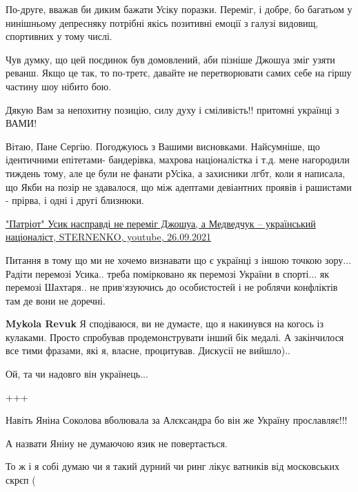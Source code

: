 \begin{itemize}
По-друге, вважав би диким бажати Усіку поразки. Переміг, і добре, бо багатьом у
нинішньому депресняку потрібні якісь позитивні емоції з галузі видовищ,
спортивних у тому числі.

Чув думку, що цей поєдинок був домовлений, аби пізніше Джошуа зміг узяти
реванш. Якщо це так, то по-третє, давайте не перетворювати самих себе на гіршу
частину шоу нібито бою.


Дякую Вам за непохитну позицію, силу духу і сміливість!! притомні українці з ВАМИ!


Вітаю, Пане Сергію. Погоджуюсь з Вашими висновками. Найсумніше, що ідентичними
епітетами- бандерівка, махрова націоналістка і т.д. мене нагородили тиждень
тому, але це були не фанати рУсіка, а захисники лгбт, коли я написала, що
Якби на позір не здавалося, що між адептами девіантних проявів і рашистами -
прірва, і одні і другі близнюки.


\href{https://youtu.be/RB-zYEcJUm8}{%
"Патріот" Усик насправді не переміг Джошуа, а Медведчук – український націоналіст, %
STERNENKO, youtube, 26.09.2021%
}


Питання в тому що ми не хочемо визнавати що є українці з іншою точкою зору...
Радіти перемозі Усика.. треба помірковано як перемозі України в спорті... як
перемозі Шахтаря.. не прив‘язуючись до особистостей і не роблячи конфліктів там
де вони не доречні.

\begin{itemize} %
\textbf{Mykola Revuk} Я сподіваюся, ви не думаєте, що я накинувся на когось із кулаками. Просто спробував продемонструвати інший бік медалі. А закінчилося все тими фразами, які я, власне, процитував. Дискусії не вийшло)..
\end{itemize} %

Ой, та чи надовго він українець...

+++


Навіть Яніна Соколова вболювала за Алєксандра бо він же Україну прославляє!!!

А назвати Яніну не думаючою язик не повертається.

То ж і я собі думаю чи я такий дурний чи ринг лікує ватників від московських скрєп (


\end{itemize}
